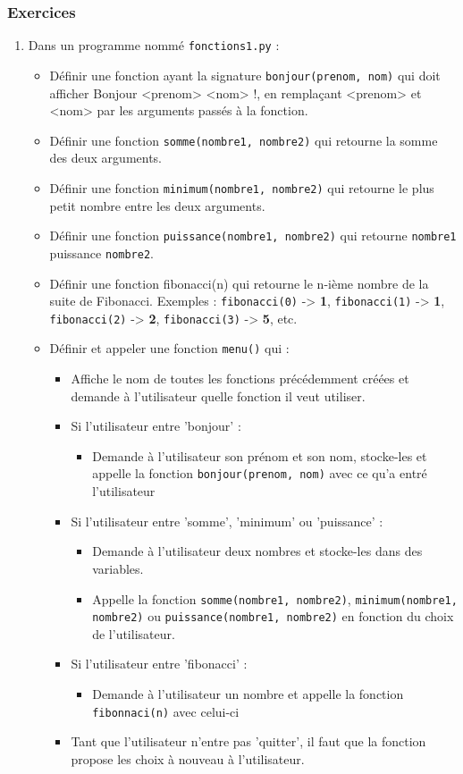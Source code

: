 \documentclass[11pt]{article}
\begin{document}
\subsubsection*{Exercices}
\label{sec:org320af26}
\begin{enumerate}
\item Dans un programme nommé \texttt{fonctions1.py} :
\begin{itemize}
\item Définir une fonction ayant la signature \texttt{bonjour(prenom, nom)} qui doit afficher \og Bonjour <prenom> <nom> !\fg{}, en remplaçant <prenom> et <nom> par les arguments passés à la fonction.
\item Définir une fonction \texttt{somme(nombre1, nombre2)} qui retourne la somme des deux arguments.
\item Définir une fonction \texttt{minimum(nombre1, nombre2)} qui retourne le plus petit nombre entre les deux arguments.
\item Définir une fonction \texttt{puissance(nombre1, nombre2)} qui retourne \texttt{nombre1} puissance \texttt{nombre2}.
\item Définir une fonction fibonacci(n) qui retourne le n-ième nombre de la suite de Fibonacci. Exemples : \texttt{fibonacci(0)} -> \textbf{1}, \texttt{fibonacci(1)} -> \textbf{1}, \texttt{fibonacci(2)} -> \textbf{2}, \texttt{fibonacci(3)} -> \textbf{5}, etc.
\item Définir et appeler une fonction \texttt{menu()} qui :
\begin{itemize}
\item Affiche le nom de toutes les fonctions précédemment créées et demande à l'utilisateur quelle fonction il veut utiliser.
\item Si l'utilisateur entre 'bonjour' :
\begin{itemize}
\item Demande à l'utilisateur son prénom et son nom, stocke-les et appelle la fonction \texttt{bonjour(prenom, nom)} avec ce qu'a entré l'utilisateur
\end{itemize}
\item Si l'utilisateur entre 'somme', 'minimum' ou 'puissance' :
\begin{itemize}
\item Demande à l'utilisateur deux nombres et stocke-les dans des variables.
\item Appelle la fonction \texttt{somme(nombre1, nombre2)}, \texttt{minimum(nombre1, nombre2)} ou \texttt{puissance(nombre1, nombre2)} en fonction du choix de l'utilisateur.
\end{itemize}
\item Si l'utilisateur entre 'fibonacci' :
\begin{itemize}
\item Demande à l'utilisateur un nombre et appelle la fonction \texttt{fibonnaci(n)} avec celui-ci
\end{itemize}
\item Tant que l'utilisateur n'entre pas 'quitter', il faut que la fonction propose les choix à nouveau à l'utilisateur.
\end{itemize}
\end{itemize}


\end{enumerate}
\end{document}
